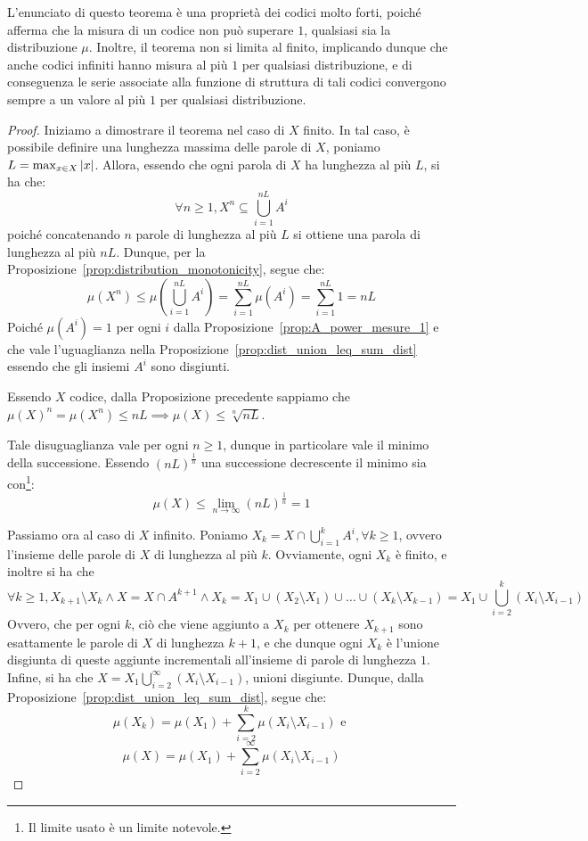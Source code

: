L'enunciato di questo teorema è una proprietà dei codici molto forti, poiché afferma che la misura di un codice non può superare \(1\), qualsiasi sia la distribuzione \(\mu\).
Inoltre, il teorema non si limita al finito, implicando dunque che anche codici infiniti hanno misura al più \(1\) per qualsiasi distribuzione, e di conseguenza le serie associate alla funzione di struttura di tali codici convergono sempre a un valore al più \(1\) per qualsiasi distribuzione.
\begin{proof}
  Iniziamo a dimostrare il teorema nel caso di \(X\) finito.
  In tal caso, è possibile definire una lunghezza massima delle parole di \(X\), poniamo \(L = \max_{x \in X} \left|x\right|\).
  Allora, essendo che ogni parola di \(X\) ha lunghezza al più \(L\), si ha che:
  \[\forall n \geq 1, X^n \subseteq \bigcup_{i=1}^{nL} A^i\]
  poiché concatenando \(n\) parole di lunghezza al più \(L\) si ottiene una parola di lunghezza al più \(nL\).
  Dunque, per la Proposizione~\ref{prop:distribution_monotonicity}, segue che:
  \[\mu(X^n) \leq \mu(\bigcup_{i=1}^{nL} A^i) = \sum_{i=1}^{nL} \mu(A^i) = \sum_{i=1}^{nL} 1 = nL\]
  Poiché \(\mu(A^i) = 1\) per ogni \(i\) dalla Proposizione~\ref{prop:A_power_mesure_1} e che vale l'uguaglianza nella Proposizione~\ref{prop:dist_union_leq_sum_dist} essendo che gli insiemi \(A^i\) sono disgiunti.

  Essendo \(X\) codice, dalla Proposizione precedente sappiamo che \({\mu(X)}^n = \mu(X^n) \leq nL \implies \mu(X) \leq \sqrt[n]{nL}\).

  Tale disuguaglianza vale per ogni \(n \geq 1\), dunque in particolare vale il minimo della successione.
  Essendo \({(nL)}^{\frac{1}{n}}\) una successione decrescente il minimo sia con\footnote{Il limite usato è un limite notevole.}:
  \[\mu(X) \leq \lim_{n \to \infty} {(nL)}^{\frac{1}{n}} = 1\]

  Passiamo ora al caso di \(X\) infinito.
  Poniamo \(X_k = X \cap \bigcup_{i=1}^{k} A^i, \forall k \geq 1\), ovvero l'insieme delle parole di \(X\) di lunghezza al più \(k\).
  Ovviamente, ogni \(X_k\) è finito, e inoltre si ha che
  \[\forall k \geq 1, X_{k+1}\setminus X_k \land X = X \cap A^{k+1} \land X_k = X_1 \cup (X_2 \setminus X_1) \cup \ldots \cup (X_k \setminus X_{k-1}) = X_1 \cup \bigcup_{i=2}^{k} (X_i \setminus X_{i-1})\]
  Ovvero, che per ogni \(k\), ciò che viene aggiunto a \(X_k\) per ottenere \(X_{k+1}\) sono esattamente le parole di \(X\) di lunghezza \(k+1\), e che dunque ogni \(X_k\) è l'unione disgiunta di queste aggiunte incrementali all'insieme di parole di lunghezza \(1\).
  Infine, si ha che \(X = X_1 \bigcup_{i=2}^{\infty} (X_i \setminus X_{i-1})\), unioni disgiunte.
  Dunque, dalla Proposizione~\ref{prop:dist_union_leq_sum_dist}, segue che:
  \[\mu(X_k) = \mu(X_1) + \sum_{i=2}^{k} \mu(X_i \setminus X_{i-1}) \text{ e }\]
  \[\mu(X) = \mu(X_1) + \sum_{i=2}^{\infty} \mu(X_i \setminus X_{i-1})\]


\end{proof}
